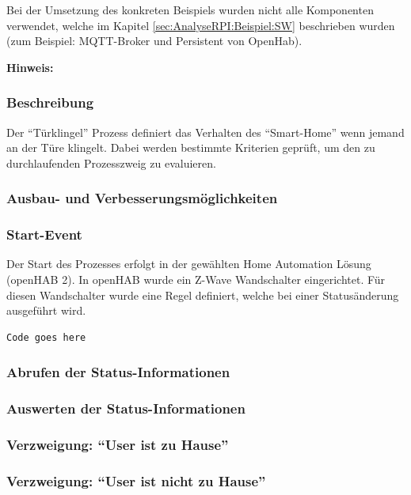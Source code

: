 Bei der Umsetzung des konkreten Beispiels wurden nicht alle Komponenten verwendet, welche im Kapitel \ref{sec:AnalyseRPI:Beispiel:SW}  beschrieben wurden (zum Beispiel: MQTT-Broker und Persistent von OpenHab).

{\small \textbf{Hinweis: }}
\subsubsection{Beschreibung}
Der "`Türklingel"' Prozess definiert das Verhalten des "`Smart-Home"' wenn jemand an der Türe klingelt. Dabei werden bestimmte Kriterien geprüft, um den zu durchlaufenden Prozesszweig zu evaluieren.

\subsubsection{Ausbau- und Verbesserungsmöglichkeiten}

\subsubsection{Start-Event}
Der Start des Prozesses erfolgt in der gewählten Home Automation Lösung (openHAB 2). In openHAB wurde ein Z-Wave Wandschalter eingerichtet. Für diesen Wandschalter wurde eine Regel definiert, welche bei einer Statusänderung ausgeführt wird. 

\begin{lstlisting}
Code goes here
\end{lstlisting}

\subsubsection{Abrufen der Status-Informationen}

\subsubsection{Auswerten der Status-Informationen}

\subsubsection{Verzweigung: "`User ist zu Hause"'}

\subsubsection{Verzweigung: "`User ist nicht zu Hause"'}

